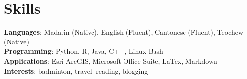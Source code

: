 \documentclass[A4,11pt]{article}
\begin{document}
\begin{comment}
This section is compressed from the various skills sections that Euro CV
recommends.
\end{comment}

\section{Skills}
 \begin{itemize}[leftmargin=0.5cm, label={}]
    \small{\item{
     \textbf{Languages}{: Madarin (Native), English (Fluent), Cantonese (Fluent), Teochew (Native)} \\
     \textbf{Programming}{: Python, R, Java, C++, Linux Bash} \\
     \textbf{Applications}{: Esri ArcGIS, Microsoft Office Suite, LaTex, Markdown} \\
     \textbf{Interests}{: badminton, travel, reading, blogging} \\
    }}
 \end{itemize}
    
\end{document}
